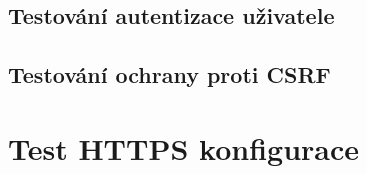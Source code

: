\subsection{Testování autentizace uživatele}

\subsection{Testování ochrany proti CSRF}


\section{Test HTTPS konfigurace}



